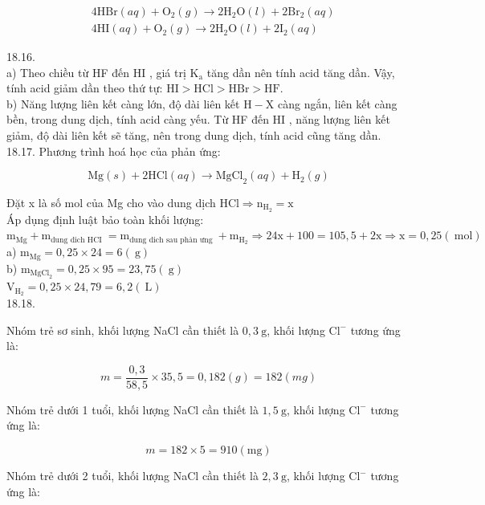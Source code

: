 \documentclass[10pt]{article}
\begin{document}
$$
\begin{aligned}
& 4 \mathrm{HBr}(a q)+\mathrm{O}_{2}(g) \rightarrow 2 \mathrm{H}_{2} \mathrm{O}(l)+2 \mathrm{Br}_{2}(a q) \\
& 4 \mathrm{HI}(a q)+\mathrm{O}_{2}(g) \rightarrow 2 \mathrm{H}_{2} \mathrm{O}(l)+2 \mathrm{I}_{2}(a q)
\end{aligned}
$$

18.16.\\
a) Theo chiều từ HF đến HI , giá trị $\mathrm{K}_{\mathrm{a}}$ tăng dần nên tính acid tăng dần. Vậy, tính acid giảm dần theo thứ tự: $\mathrm{HI}>\mathrm{HCl}>\mathrm{HBr}>\mathrm{HF}$.\\
b) Năng lượng liên kết càng lớn, độ dài liên kết $\mathrm{H}-\mathrm{X}$ càng ngắn, liên kết càng bền, trong dung dịch, tính acid càng yếu. Từ HF đến HI , năng lượng liên kết giảm, độ dài liên kết sẽ tăng, nên trong dung dịch, tính acid cũng tăng dần.\\
18.17. Phương trình hoá học của phản ứng:

$$
\mathrm{Mg}(s)+2 \mathrm{HCl}(a q) \rightarrow \mathrm{MgCl}_{2}(a q)+\mathrm{H}_{2}(g)
$$

Đặt x là số mol của Mg cho vào dung dịch $\mathrm{HCl} \Rightarrow \mathrm{n}_{\mathrm{H}_{2}}=\mathrm{x}$\\
Áp dụng định luật bảo toàn khối lượng: $\mathrm{m}_{\mathrm{Mg}}+\mathrm{m}_{\text {dung dich HCI }}=\mathrm{m}_{\text {dung dich sau phàn ưng }}+\mathrm{m}_{\mathrm{H}_{2}} \Rightarrow 24 \mathrm{x}+100=105,5+2 \mathrm{x} \Rightarrow \mathrm{x}=0,25(\mathrm{~mol})$\\
a) $\mathrm{m}_{\mathrm{Mg}}=0,25 \times 24=6(\mathrm{~g})$\\
b) $\mathrm{m}_{\mathrm{MgCl}_{2}}=0,25 \times 95=23,75(\mathrm{~g})$\\
$\mathrm{V}_{\mathrm{H}_{2}}=0,25 \times 24,79=6,2(\mathrm{~L})$\\
18.18.

Nhóm trẻ sơ sinh, khối lượng NaCl cần thiết là $0,3 \mathrm{~g}$, khối lượng $\mathrm{Cl}^{-}$ tương ứng là:

$$
m=\frac{0,3}{58,5} \times 35,5=0,182(g)=182(m g)
$$

Nhóm trẻ dưới 1 tuổi, khối lượng NaCl cần thiết là $1,5 \mathrm{~g}$, khối lượng $\mathrm{Cl}^{-}$ tương ứng là:

$$
m=182 \times 5=910(\mathrm{mg})
$$

Nhóm trẻ dưới 2 tuổi, khối lượng NaCl cần thiết là $2,3 \mathrm{~g}$, khối lượng $\mathrm{Cl}^{-}$ tương ứng là:
\end{document}

